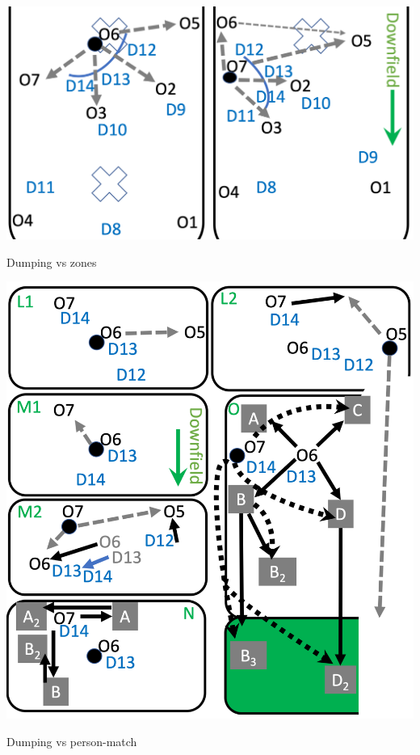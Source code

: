 \documentclass{tufte-handout}
\begin{document}
\begin{marginfigure}%
  \includegraphics[width=\linewidth]{dump_zone}
 \caption{Dumping vs zones}
 \label{fig:dump_zone}
 \end{marginfigure}



\begin{marginfigure}%
  \includegraphics[width=\linewidth]{dump_match}
 \caption{Dumping vs person-match}
 \label{fig:dump_match}
 \end{marginfigure}
\end{document}
